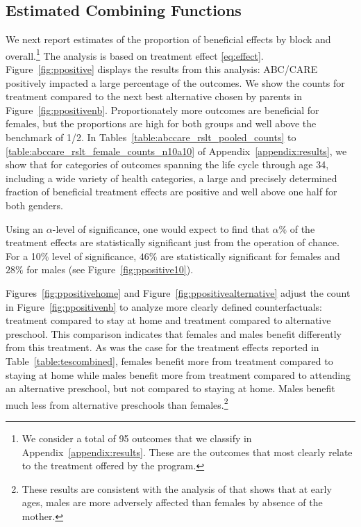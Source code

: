 \subsection{Estimated Combining Functions}

We next report estimates of the proportion of beneficial effects by block and overall.\footnote{We consider a total of 95 outcomes that we classify in Appendix~\ref{appendix:results}. These are the outcomes that most clearly relate to the treatment offered by the program.} The analysis is based on treatment effect \eqref{eq:effect}. Figure~\ref{fig:ppositive} displays the results from this analysis: ABC/CARE positively impacted a large percentage of the outcomes. We show the counts for treatment compared to the next best alternative chosen by parents in Figure~\ref{fig:ppositivenb}. Proportionately more outcomes are beneficial for females, but the proportions are high for both groups and well above the benchmark of 1/2. In Tables~\ref{table:abccare_rslt_pooled_counts} to \ref{table:abccare_rslt_female_counts_n10a10} of Appendix~\ref{appendix:results}, we show that for categories of outcomes spanning the life cycle through age 34, including a wide variety of health categories, a large and precisely determined fraction of beneficial treatment effects are positive and well above one half for both genders.

Using an $\alpha$-level of significance, one would expect to find that $\alpha\%$ of the treatment effects are statistically significant just from the operation of chance. For a 10\% level of significance, $46\%$ are statistically significant for females and $28\%$ for males (see Figure~\ref{fig:ppositive10}).

Figures~\ref{fig:ppositivehome} and Figure~\ref{fig:ppositivealternative} adjust the count in Figure~\ref{fig:ppositivenb} to analyze more clearly defined counterfactuals: treatment compared to stay at home and treatment compared to alternative preschool. This comparison indicates that females and males benefit differently from this treatment. As was the case for the treatment effects reported in Table~\ref{table:tescombined}, females benefit more from treatment compared to staying at home while males benefit more from treatment compared to attending an alternative preschool, but not compared to staying at home. Males benefit much less from alternative preschools than females.\footnote{These results are consistent with the analysis of \citet{Rutter_1972_Maternal-Deprivation} that shows that at early ages, males are more adversely affected than females by absence of the mother.}

